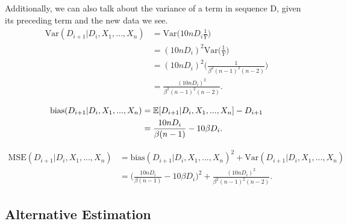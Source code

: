Additionally, we can also talk about the variance of a term in sequence D, given its preceding term and the new data we see. 
\begin{align}
\text{Var}(D_{i+1} | D_{i}, X_1, \dots, X_{n}) &= \text{Var}\bigg(10n D_i \frac{1}{Y}\bigg) \\
&= (10n D_i)^2 \text{Var}\bigg(\frac{1}{Y}\bigg) \\
&= (10n D_i)^2 \Bigg(\frac{1}{\beta^2(n-1)^2(n-2)}\Bigg) \\
&= \frac{(10n D_i)^2}{\beta^2(n-1)^2(n-2)}.
\end{align}

\begin{align}
\text{bias}(D_{i+1}|D_i,X_1,...,X_n) &= \operatorname{\mathbb{E}}[D_{i+1}|D_i,X_1,...,X_n] - D_{i+1} \\
&= \frac{10n D_i}{\beta(n-1)} - 10\beta D_i.
\end{align}

\begin{align}
\text{MSE}(D_{i+1}|D_i,X_1,...,X_n) &= \text{bias}(D_{i+1}|D_i,X_1,...,X_n)^2 + \text{Var}(D_{i+1}|D_i,X_1,...,X_n) \\
&= \Bigg(\frac{10n D_i}{\beta(n-1)} - 10\beta D_i\Bigg)^2 + \frac{(10n D_i)^2}{\beta^2(n-1)^2(n-2)}.
\end{align}

\subsection{Alternative Estimation}

